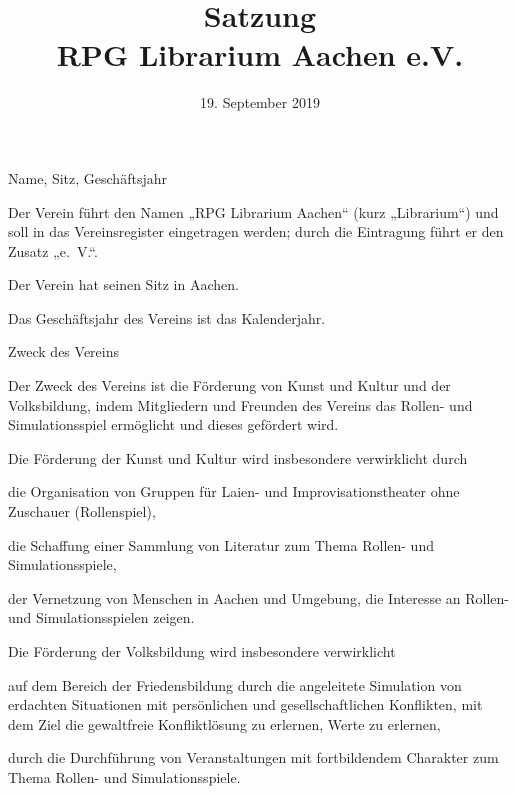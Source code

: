 \documentclass[11pt,a4paper,twoside,openany,article]{memoir}
\title{ Satzung \\ RPG Librarium Aachen e.V.}
\date{19. September 2019}
\begin{document}
  \maketitle
  \sloppy
\begin{para}{Name, Sitz, Geschäftsjahr}
  \label{p:name}
  \item Der Verein führt den Namen „RPG Librarium Aachen“ (kurz „Librarium“) und soll in das Vereinsregister eingetragen werden; durch die Eintragung führt er den Zusatz „e.~V.“.
  \item Der Verein hat seinen Sitz in Aachen.
  \item Das Geschäftsjahr des Vereins ist das Kalenderjahr.
\end{para}

\begin{para}{Zweck des Vereins}
  \label{p:zweck}
  \item Der Zweck des Vereins ist die Förderung von Kunst und Kultur und der Volksbildung, indem Mitgliedern und Freunden des Vereins das Rollen- und Simulationsspiel ermöglicht und dieses gefördert wird.
  \item Die Förderung der Kunst und Kultur wird insbesondere verwirklicht durch
  \begin{subpara}
    \item die Organisation von Gruppen für Laien- und Improvisationstheater ohne Zuschauer (Rollenspiel),
    \item die Schaffung einer Sammlung von Literatur zum Thema Rollen- und Simulationsspiele,
    \item der Vernetzung von Menschen in Aachen und Umgebung, die Interesse an Rollen- und Simulationsspielen zeigen.
  \end{subpara}
  \item Die Förderung der Volksbildung wird insbesondere verwirklicht
  \begin{subpara}
    \item auf dem Bereich der Friedensbildung durch die angeleitete Simulation von erdachten Situationen mit persönlichen und gesellschaftlichen Konflikten, mit dem Ziel die gewaltfreie Konfliktlösung zu erlernen,
 Werte zu erlernen,
    \item durch die Durchführung von Veranstaltungen mit fortbildendem Charakter zum Thema Rollen- und Simulationsspiele.
  \end{subpara}
\end{para}
\end{document}
